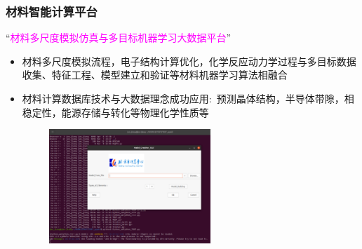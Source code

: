\begin{frame}
\begin{minipage}[b]{0.47\linewidth}
\begin{figure}[h!]
%
\caption{\fontsize{6.5pt}{4.5pt}\selectfont{适用于异质界面的高通量材料计算自动流程软件架构}}%
\label{MP_comp_BCC}
\end{figure}
\end{minipage}
\end{frame}

\begin{frame}
	\frametitle{材料智能计算平台}
	“\textcolor{magenta}{材料多尺度模拟仿真与多目标机器学习大数据平台}”
	\begin{itemize}
		\item 材料多尺度模拟流程，电子结构计算优化，化学反应动力学过程与多目标数据收集、特征工程、模型建立和验证等材料机器学习算法相融合
		\item 材料计算数据库技术与大数据理念成功应用:~预测晶体结构，半导体带隙，相稳定性，能源存储与转化等物理化学性质等
	\end{itemize}
\begin{figure}[h!]
\centering
\vspace*{-7pt}
\includegraphics[height=1.70in,width=2.85in,viewport=0 0 1200 870,clip]{Figures/BCC-Process_1.png}
\label{BCC-Process_1}
\end{figure}
\end{frame}


